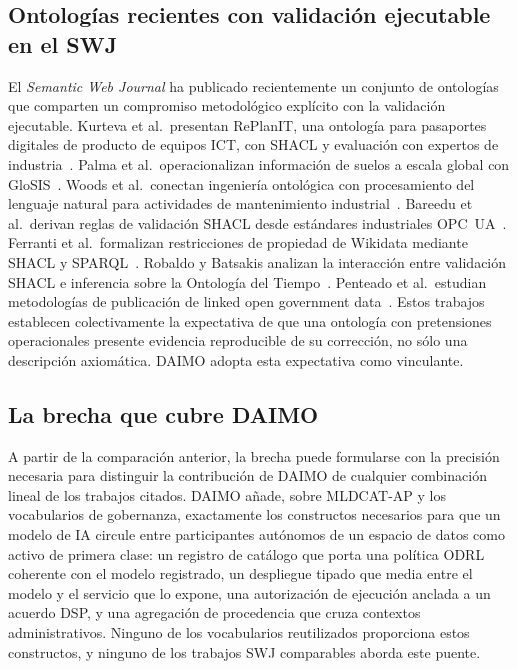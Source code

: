 \documentclass[11pt,a4paper]{article}
\begin{document}
\subsection{Ontologías recientes con validación ejecutable en el SWJ}

El \emph{Semantic Web Journal} ha publicado recientemente un conjunto de ontologías que comparten un compromiso metodológico explícito con la validación ejecutable. Kurteva et al.\ presentan RePlanIT, una ontología para pasaportes digitales de producto de equipos ICT, con SHACL y evaluación con expertos de industria~\cite{kurteva}. Palma et al.\ operacionalizan información de suelos a escala global con GloSIS~\cite{palma}. Woods et al.\ conectan ingeniería ontológica con procesamiento del lenguaje natural para actividades de mantenimiento industrial~\cite{woods}. Bareedu et al.\ derivan reglas de validación SHACL desde estándares industriales OPC~UA~\cite{bareedu24}. Ferranti et al.\ formalizan restricciones de propiedad de Wikidata mediante SHACL y SPARQL~\cite{ferranti}. Robaldo y Batsakis analizan la interacción entre validación SHACL e inferencia sobre la Ontología del Tiempo~\cite{robaldo}. Penteado et al.\ estudian metodologías de publicación de linked open government data~\cite{penteado23}. Estos trabajos establecen colectivamente la expectativa de que una ontología con pretensiones operacionales presente evidencia reproducible de su corrección, no sólo una descripción axiomática. DAIMO adopta esta expectativa como vinculante.

\subsection{La brecha que cubre DAIMO}

A partir de la comparación anterior, la brecha puede formularse con la precisión necesaria para distinguir la contribución de DAIMO de cualquier combinación lineal de los trabajos citados. DAIMO añade, sobre MLDCAT-AP y los vocabularios de gobernanza, exactamente los constructos necesarios para que un modelo de IA circule entre participantes autónomos de un espacio de datos como activo de primera clase: un registro de catálogo que porta una política ODRL coherente con el modelo registrado, un despliegue tipado que media entre el modelo y el servicio que lo expone, una autorización de ejecución anclada a un acuerdo DSP, y una agregación de procedencia que cruza contextos administrativos. Ninguno de los vocabularios reutilizados proporciona estos constructos, y ninguno de los trabajos SWJ comparables aborda este puente.
\end{document}
